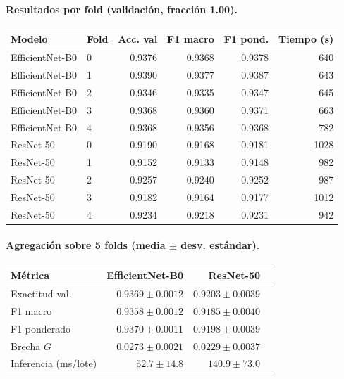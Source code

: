 \paragraph{Resultados por fold (validación, fracción 1.00).}
\begin{center}
\small
\begin{tabular}{llrrrr}\hline
\textbf{Modelo} & \textbf{Fold} & \textbf{Acc. val} & \textbf{F1 macro} & \textbf{F1 pond.} & \textbf{Tiempo (s)} \\\hline
EfficientNet-B0 & 0 & 0.9376 & 0.9368 & 0.9378 & 640 \\
EfficientNet-B0 & 1 & 0.9390 & 0.9377 & 0.9387 & 643 \\
EfficientNet-B0 & 2 & 0.9346 & 0.9335 & 0.9347 & 645 \\
EfficientNet-B0 & 3 & 0.9368 & 0.9360 & 0.9371 & 663 \\
EfficientNet-B0 & 4 & 0.9368 & 0.9356 & 0.9368 & 782 \\
ResNet-50 & 0 & 0.9190 & 0.9168 & 0.9181 & 1028 \\
ResNet-50 & 1 & 0.9152 & 0.9133 & 0.9148 & 982 \\
ResNet-50 & 2 & 0.9257 & 0.9240 & 0.9252 & 987 \\
ResNet-50 & 3 & 0.9182 & 0.9164 & 0.9177 & 1012 \\
ResNet-50 & 4 & 0.9234 & 0.9218 & 0.9231 & 942 \\\hline
\end{tabular}
\end{center}

\paragraph{Agregación sobre 5 folds (media $\pm$ desv. estándar).}
\begin{center}
\small
\begin{tabular}{lrrr}\hline
\textbf{Métrica} & \textbf{EfficientNet-B0} & \textbf{ResNet-50} \\\hline
Exactitud val. & $0.9369 \pm 0.0012$ & $0.9203 \pm 0.0039$ \\
F1 macro & $0.9358 \pm 0.0012$ & $0.9185 \pm 0.0040$ \\
F1 ponderado & $0.9370 \pm 0.0011$ & $0.9198 \pm 0.0039$ \\
Brecha $G$ & $0.0273 \pm 0.0021$ & $0.0229 \pm 0.0037$ \\
Inferencia (ms/lote) & $52.7 \pm 14.8$ & $140.9 \pm 73.0$ \\\hline
\end{tabular}
\end{center}

